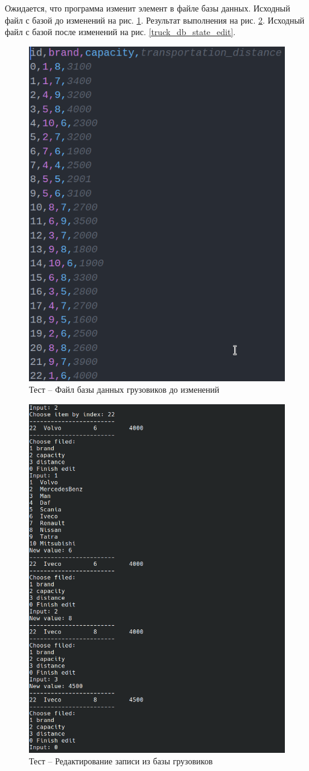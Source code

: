 Ожидается, что программа изменит элемент в файле базы данных.
Исходный файл с базой до изменений на рис. \ref{truck_db_state_add2}.
Результат выполнения на рис. \ref{truck_db_edit}.
Исходный файл с базой после изменений на рис. \ref{truck_db_state_edit}.

\begin{figure}[H]
	\centering
	\includegraphics[width=0.7\linewidth]{photo/tests/admin/truck_db_state_add}
	\caption{Тест -- Файл базы данных грузовиков до изменений}
	\label{truck_db_state_add2}
\end{figure}

\begin{figure}[H]
	\centering
	\includegraphics[width=0.8\linewidth]{photo/tests/admin/truck_db_edit}
	\caption{Тест -- Редактирование записи из базы грузовиков}
	\label{truck_db_edit}
\end{figure}

